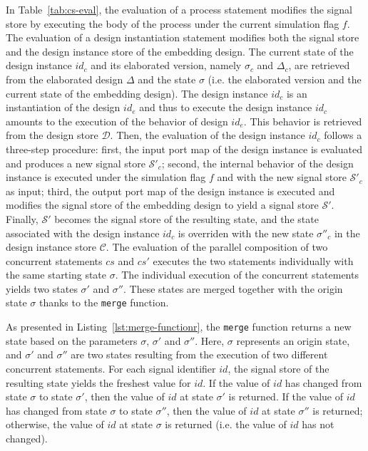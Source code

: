 In Table~\ref{tab:cs-eval}, the evaluation of a process statement
modifies the signal store by executing the body of the process under
the current simulation flag $f$. The evaluation of a design
instantiation statement modifies both the signal store and the design
instance store of the embedding design. The current state of the
design instance $id_c$ and its elaborated version, namely $\sigma_c$
and $\Delta_c$, are retrieved from the elaborated design $\Delta$ and
the state $\sigma$ (i.e. the elaborated version and the current state
of the embedding design). The design instance $id_c$ is an
instantiation of the design $id_e$ and thus to execute the design
instance $id_c$ amounts to the execution of the behavior of design
$id_e$. This behavior is retrieved from the design store
$\mathcal{D}$. Then, the evaluation of the design instance $id_c$
follows a three-step procedure: first, the input port map of the
design instance is evaluated and produces a new signal store
$\mathcal{S}'_c$; second, the internal behavior of the design instance
is executed under the simulation flag $f$ and with the new signal
store $\mathcal{S}'_c$ %
as input; third, the output port map of the design instance is
executed and modifies the signal store of the embedding design to
yield a signal store $\mathcal{S}'$. Finally, $\mathcal{S}'$ becomes
the signal store of the resulting state, and the state associated with
the design instance $id_c$ is overriden with the new state
$\sigma''_c$ in the design instance store $\mathcal{C}$.  The
evaluation of the parallel composition of two concurrent statements
$cs$ and $cs'$ executes the two statements individually with the same
starting state $\sigma$. The individual execution of the concurrent
statements yields two states $\sigma'$ and $\sigma''$. These states
are merged together with the origin state $\sigma$ thanks to the
\texttt{merge} function.

As presented in Listing~\ref{lst:merge-functionr}, the \texttt{merge}
function returns a new state based on the parameters $\sigma$,
$\sigma'$ and $\sigma''$. Here, $\sigma$ represents an origin state,
and $\sigma'$ and $\sigma''$ are two states resulting from the
execution of two different concurrent statements. For each signal
identifier $id$, the signal store of the resulting state yields the
freshest value for $id$. If the value of $id$ has changed from state
$\sigma$ to state $\sigma'$, then the value of $id$ at state $\sigma'$
is returned. If the value of $id$ has changed from state $\sigma$ to
state $\sigma''$, then the value of $id$ at state $\sigma''$ is
returned; otherwise, the value of $id$ at state $\sigma$ is returned
(i.e. the value of $id$ has not changed).

